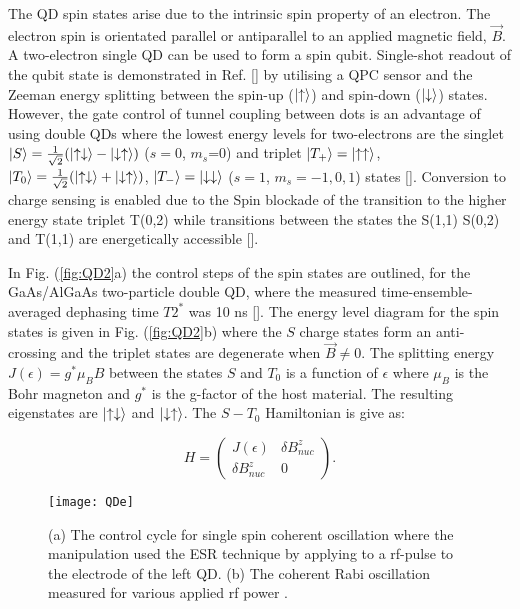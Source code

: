 The QD spin states arise due to the intrinsic spin property of an electron. The electron spin is orientated parallel or antiparallel to an applied magnetic field, $\vec{B}$. A two-electron single QD can be used to form a spin qubit. Single-shot readout of the qubit state is demonstrated in Ref. [] by utilising a QPC sensor and the Zeeman energy splitting between the spin-up ($\lvert\uparrow\rangle$) and spin-down ($\lvert\downarrow\rangle$) states. However, the gate control of tunnel coupling between dots is an advantage of using double QDs where the lowest energy levels for two-electrons are the singlet $\lvert S\rangle=\frac{1}{\sqrt{2}}(\lvert\uparrow \downarrow\rangle-\lvert\downarrow \uparrow\rangle)$  ($s=0$, $m_{s}$=0) and triplet $\lvert T_{+}\rangle=\lvert\uparrow \uparrow\rangle$, $\lvert T_{0}\rangle=\frac{1}{\sqrt{2}}(\lvert\uparrow \downarrow\rangle+\lvert\downarrow \uparrow\rangle)$, $\lvert T_{-}\rangle=\lvert\downarrow \downarrow\rangle$  ($s=1$, $m_{s}=-1,0,1$) states []. Conversion to charge sensing is enabled due to the Spin blockade of the transition to the higher energy state triplet T(0,2) while transitions between the states the S(1,1) S(0,2) and T(1,1) are energetically accessible []. 

In Fig. (\ref{fig:QD2}a) the control steps of the spin states are outlined, for the GaAs/AlGaAs two-particle double QD, where the measured time-ensemble-averaged dephasing time $T2^{*}$ was 10 ns []. The energy level diagram for the spin states is given in Fig. (\ref{fig:QD2}b) where the $S$ charge states form an anti-crossing and the triplet states are degenerate when $\vec{B} \neq 0$. The splitting energy $J(\epsilon)=g^{*}\mu_{B}B$ between the states $S$ and $T_{0}$ is a function of $\epsilon$ where $\mu_{B}$ is the Bohr magneton and $g^{*}$ is the g-factor of the host material. The resulting eigenstates are $\lvert\uparrow \downarrow\rangle$ and $\lvert\downarrow \uparrow\rangle$. The $S-T_{0}$ Hamiltonian is give as:


\begin{equation}
\label{eq:interactionham0}
H=\begin{pmatrix}
J(\epsilon) &  \delta B^{z}_{nuc}\\ 
\delta B^{z}_{nuc} & 0
\end{pmatrix}.
\end{equation}

\begin{figure}[b]
\centering
\texttt{[image: QDe]}
\caption{\label{fig:QDe} (a) The control cycle for single spin coherent oscillation where the manipulation used the ESR technique by applying to a rf-pulse to the electrode of the left QD. (b) The coherent Rabi oscillation measured for various applied rf power \citep{Koppens2006DrivenDot}.}
\end{figure}


